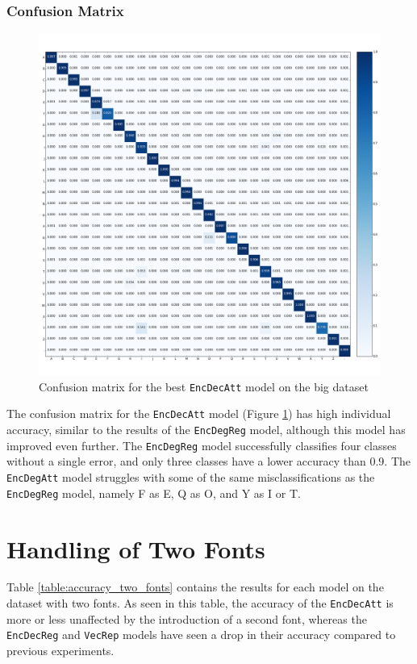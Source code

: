 \subsubsection{Confusion Matrix}
\begin{figure}[H]
    \centering
    \includegraphics[width=1\textwidth]{fig/results/experiment1/big/encdecatt/confusion_matrix.png}
    \caption{Confusion matrix for the best {\tt EncDecAtt} model on the big dataset}
    \label{fig:result1_big_encdecatt_confusion_matrix}
\end{figure}

The confusion matrix for the {\tt EncDecAtt} model (Figure \ref{fig:result1_big_encdecatt_confusion_matrix}) has high individual accuracy, similar to the results of the {\tt EncDegReg} model, although this model has improved even further. The {\tt EncDegReg} model successfully classifies four classes without a single error, and only three classes have a lower accuracy than 0.9. The {\tt EncDegAtt} model struggles with some of the same misclassifications as the {\tt EncDegReg} model, namely F as E, Q as O, and Y as I or T.


\section{Handling of Two Fonts}
\label{sec:handling_of_two_fonts}
Table \ref{table:accuracy_two_fonts} contains the results for each model on the dataset with two fonts. As seen in this table, the accuracy of the {\tt EncDecAtt} is more or less unaffected by the introduction of a second font, whereas the {\tt EncDecReg} and {\tt VecRep} models have seen a drop in their accuracy compared to previous experiments. 

